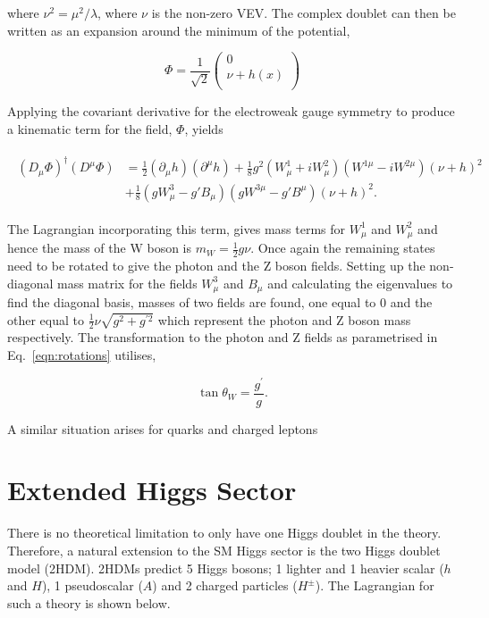 where $\nu^2 = \mu^2 / \lambda$, where $\nu$ is the non-zero VEV.
The complex doublet can then be written as an expansion around the minimum of the potential,

\begin{equation}
\Phi = \frac{1}{\sqrt{2}}
	\begin{pmatrix} 
		0 \\
		\nu + h(x)\\
	\end{pmatrix}
\end{equation}

Applying the covariant derivative for the electroweak gauge symmetry to produce a kinematic term for the field, $\Phi$, yields

\begin{align}
\begin{split}
(D_{\mu}\Phi)^{\dagger} (D^{\mu}\Phi) &= \frac{1}{2}(\partial_{\mu}h)(\partial^{\mu}h) + \frac{1}{8} g^{2} (W_{\mu}^{1} + i W_{\mu}^{2})(W^{1\mu} - i W^{2\mu})(\nu + h)^2 \\
&+ \frac{1}{8} (g W_{\mu}^{3} - g' B_{\mu})(g W^{3\mu} - g' B^{\mu})(\nu + h)^2.
\end{split}
\end{align}

The Lagrangian incorporating this term, gives mass terms for $W_{\mu}^{1}$ and $W_{\mu}^{2}$ and hence the mass of the W boson is $m_W = \frac{1}{2}g\nu$.
Once again the remaining states need to be rotated to give the photon and the Z boson fields.
Setting up the non-diagonal mass matrix for the fields $W_{\mu}^{3}$ and $B_{\mu}$ and calculating the eigenvalues to find the diagonal basis, masses of two fields are found, one equal to 0 and the other equal to $\frac{1}{2} \nu \sqrt{g^2 + g^{\prime 2}}$ which represent the photon and Z boson mass respectively.
The transformation to the photon and Z fields as parametrised in Eq.~\ref{eqn:rotations} utilises,

\begin{equation}
\tan\theta_W = \frac{g^{\prime}}{g}.
\end{equation}

A similar situation arises for quarks and charged leptons

\section{Extended Higgs Sector}

There is no theoretical limitation to only have one Higgs doublet in the theory.
Therefore, a natural extension to the SM Higgs sector is the two Higgs doublet model (2HDM).
2HDMs predict 5 Higgs bosons; 1 lighter and 1 heavier scalar ($h$ and $H$), 1 pseudoscalar ($A$) and 2 charged particles ($H^\pm$).
The Lagrangian for such a theory is shown below.

